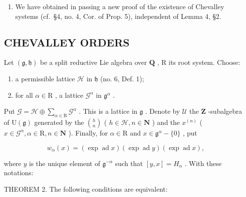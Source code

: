 \begin{enumerate}
\def\labelenumi{\arabic{enumi})}
\setcounter{enumi}{5}
\tightlist
\item
  We have obtained in passing a new proof of the existence of Chevalley systems (cf.~§4, no. 4, Cor. of Prop. 5), independent of Lemma 4, §2.
\end{enumerate}

\subsection{CHEVALLEY ORDERS}

Let \((\mathfrak{g},\mathfrak{h})\) be a split reductive Lie algebra over \(\mathbf{Q}\) , \(\mathrm{R}\) its root system. Choose:

\begin{enumerate}
\def\labelenumi{\alph{enumi})}
\item
  a permissible lattice \(\mathcal{H}\) in \(\mathfrak{h}\) (no. 6, Def. 1);
\item
  for all \(\alpha \in \mathrm{R}\) , a lattice \(\mathcal{G}^{\alpha}\) in \(\mathfrak{g}^{\alpha}\) .
\end{enumerate}

Put \(\mathcal{G} = \mathcal{H} \oplus \sum_{\alpha \in \mathrm{R}} \mathcal{G}^{\alpha}\) . This is a lattice in \(\mathfrak{g}\) . Denote by \(\mathcal{U}\) the \(\mathbf{Z}\) -subalgebra of \(\mathrm{U}(\mathfrak{g})\) generated by the \(\binom{h}{n}\) ( \(h \in \mathcal{H}, n \in \mathbf{N}\) ) and the \(x^{(n)}\) ( \(x \in \mathcal{G}^{\alpha}, \alpha \in \mathrm{R}, n \in \mathbf{N}\) ). Finally, for \(\alpha \in \mathrm{R}\) and \(x \in \mathfrak{g}^{\alpha} - \{0\}\) , put

\[
w _ {\alpha} (x) = (\exp \operatorname{ad} x) (\exp \operatorname{ad} y) (\exp \operatorname{ad} x),
\]

where \(y\) is the unique element of \(\mathfrak{g}^{-\alpha}\) such that \([y,x] = H_{\alpha}\) . With these notations:

THEOREM 2. The following conditions are equivalent:

